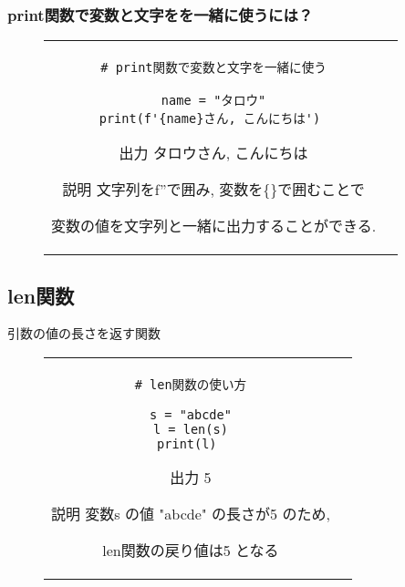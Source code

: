 \documentclass{jsarticle}
\begin{document}
\subsubsection{print関数で変数と文字をを一緒に使うには？} \vspace{-5mm}
\begin{figure}[h]
	\begin{tabular}{cc}
		\begin{minipage}[t]{.4\textwidth}
			\begin{lstlisting}[caption=print関数]
# print関数で変数と文字を一緒に使う

name = "タロウ"
print(f'{name}さん, こんにちは') \end{lstlisting}
		\end{minipage} \hspace{5mm}
		\begin{minipage}[t]{.5\textwidth}
			\begin{minipage}[t]{.6\textwidth}
				\begin{itembox}[l]{出力}
					タロウさん, こんにちは
				\end{itembox}
			\end{minipage}
			\begin{itembox}[l]{説明}
				文字列をf''で囲み, 変数を\{\}で囲むことで \par
				変数の値を文字列と一緒に出力することができる.
			\end{itembox}
		\end{minipage}
	\end{tabular}
\end{figure}

\newpage
\subsection{len関数}
引数の値の長さを返す関数 \vspace{-5mm}
\begin{figure}[h]
	\begin{tabular}{cc}
		\begin{minipage}[t]{.4\textwidth}
			\begin{lstlisting}[caption=len関数]
# len関数の使い方

s = "abcde"
l = len(s)
print(l) \end{lstlisting}
		\end{minipage} \hspace{5mm}
		\begin{minipage}[t]{.4\textwidth}
			\begin{minipage}[t]{.25\textwidth}
				\begin{itembox}[l]{出力}
					5
				\end{itembox}
			\end{minipage}
			\begin{itembox}[l]{説明}
				変数s の値 "abcde" の長さが5 のため,  \par
				len関数の戻り値は5 となる
			\end{itembox}
		\end{minipage}
	\end{tabular}
\end{figure}
\end{document}
